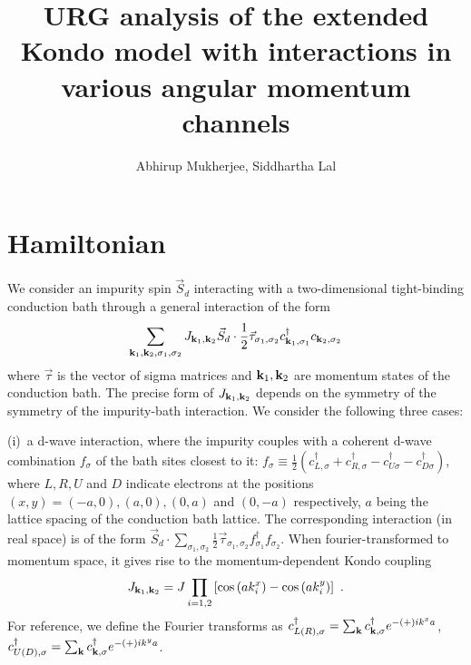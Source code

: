 \documentclass{revtex4-2}
\begin{document}
\title{URG analysis of the extended Kondo model with interactions in various angular momentum channels}
\author{Abhirup Mukherjee, Siddhartha Lal}
\maketitle
\section{Hamiltonian}
We consider an impurity spin \(\vec S_d\) interacting with a two-dimensional tight-binding conduction bath through a general interaction of the form
\begin{equation}\begin{aligned}
		\sum_{{\bf k}_1, {\bf k}_2, \sigma_1, \sigma_2} J_{{\bf k}_1, {\bf k}_2} \vec{S}_d\cdot\frac{1}{2}\vec{\tau}_{\sigma_1,\sigma_2} c^\dagger_{{\bf k}_1,\sigma_1}c_{{\bf k}_2,\sigma_2}
\end{aligned}\end{equation}
where \(\vec \tau\) is the vector of sigma matrices and \({\bf k}_1,{\bf k}_2\) are momentum states of the conduction bath. The precise form of \(J_{{\bf k}_1, {\bf k}_2}\) depends on the symmetry of the symmetry of the impurity-bath interaction. We consider the following three cases:

(i)~a d-wave interaction, where the impurity couples with a coherent d-wave combination \(f_\sigma\) of the bath sites closest to it: \(f_\sigma \equiv \frac{1}{2}\left(c^\dagger_{L,\sigma} + c^\dagger_{R,\sigma} - c^\dagger_{U\sigma} - c^\dagger_{D\sigma}\right)\), where \(L,R,U\) and \(D\) indicate electrons at the positions \((x,y)=\left(-a,0\right), \left( a,0 \right) , \left( 0,a \right) \) and \(\left( 0,-a \right) \) respectively, \(a\) being the lattice spacing of the conduction bath lattice. The corresponding interaction (in real space) is of the form \(\vec{S}_d\cdot\sum_{\sigma_1,\sigma_2}\frac{1}{2}\vec{\tau}_{\sigma_1,\sigma_2}f^\dagger_{\sigma_1}f_{\sigma_2}\). When fourier-transformed to momentum space, it gives rise to the momentum-dependent Kondo coupling 
\begin{equation}\begin{aligned}\label{J_dwave}
	J_{{\bf k}_1, {\bf k}_2} = J\prod_{i=1,2}\left[\cos\left( ak_i^x \right) - \cos\left( ak_i^y \right) \right]~.
\end{aligned}\end{equation}
For reference, we define the Fourier transforms as \(c^\dagger_{L(R),\sigma} = \sum_{{\bf k}}c^\dagger_{{\bf k},\sigma}e^{-(+)ik^x a}\), \(c^\dagger_{U(D),\sigma} = \sum_{{\bf k}}c^\dagger_{{\bf k},\sigma}e^{-(+)ik^y a}\).
\end{document}
